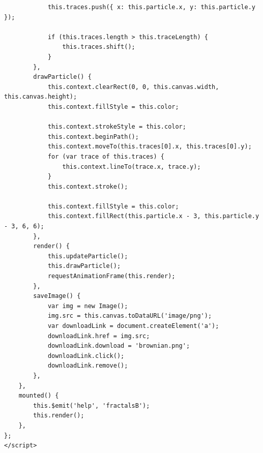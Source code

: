 \documentclass[oneside,14pt]{extarticle}
\begin{document}
\begin{normalsize}
\begin{tiny}
\begin{lstlisting}
			this.traces.push({ x: this.particle.x, y: this.particle.y });
			
			if (this.traces.length > this.traceLength) {
				this.traces.shift();
			}
		},
		drawParticle() {
			this.context.clearRect(0, 0, this.canvas.width, this.canvas.height);
			this.context.fillStyle = this.color;
			
			this.context.strokeStyle = this.color;
			this.context.beginPath();
			this.context.moveTo(this.traces[0].x, this.traces[0].y);
			for (var trace of this.traces) {
				this.context.lineTo(trace.x, trace.y);
			}
			this.context.stroke();
			
			this.context.fillStyle = this.color;
			this.context.fillRect(this.particle.x - 3, this.particle.y - 3, 6, 6);
		},
		render() {
			this.updateParticle();
			this.drawParticle();
			requestAnimationFrame(this.render);
		},
		saveImage() {
			var img = new Image();
			img.src = this.canvas.toDataURL('image/png');
			var downloadLink = document.createElement('a');
			downloadLink.href = img.src;
			downloadLink.download = 'brownian.png';
			downloadLink.click();
			downloadLink.remove();
		},
	},
	mounted() {
		this.$emit('help', 'fractalsB');
		this.render();
	},
};
</script>


\end{lstlisting}
\end{tiny}
\end{normalsize}
\end{document}

